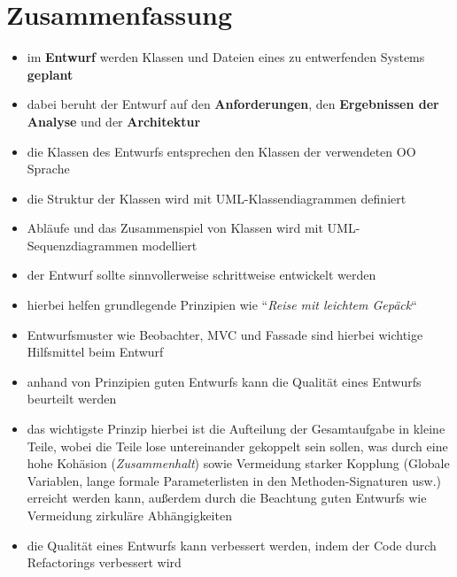 \section{Zusammenfassung}


\begin{itemize}
    \item im \textbf{Entwurf} werden Klassen und Dateien eines zu entwerfenden Systems \textbf{geplant}
    \item dabei beruht der Entwurf auf den \textbf{Anforderungen}, den \textbf{Ergebnissen der Analyse} und der \textbf{Architektur}
    \item die Klassen des Entwurfs entsprechen den Klassen der verwendeten OO Sprache
    \item die Struktur der Klassen wird mit UML-Klassendiagrammen definiert
    \item Abläufe und das Zusammenspiel von Klassen wird mit UML-Sequenzdiagrammen modelliert
    \item der Entwurf sollte sinnvollerweise schrittweise entwickelt werden
    \item hierbei helfen grundlegende Prinzipien wie ``\textit{Reise mit leichtem Gepäck}``
    \item Entwurfsmuster wie Beobachter, MVC und Fassade sind hierbei wichtige Hilfsmittel beim Entwurf
    \item anhand von Prinzipien guten Entwurfs kann die Qualität eines Entwurfs beurteilt werden
    \item das wichtigste Prinzip hierbei ist die Aufteilung der Gesamtaufgabe in kleine Teile, wobei die Teile lose untereinander gekoppelt sein sollen, was durch eine hohe Kohäsion (\textit{Zusammenhalt}) sowie Vermeidung starker Kopplung (Globale Variablen, lange formale Parameterlisten in den Methoden-Signaturen usw.) erreicht werden kann, außerdem durch die Beachtung guten Entwurfs wie Vermeidung zirkuläre Abhängigkeiten
    \item die Qualität eines Entwurfs kann verbessert werden, indem der Code durch Refactorings verbessert wird
\end{itemize}